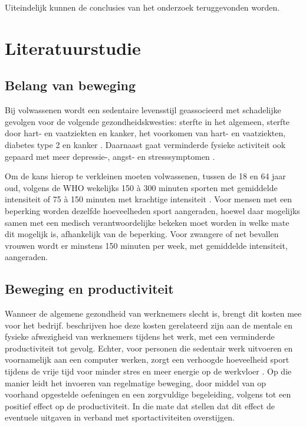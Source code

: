 Uiteindelijk kunnen de conclusies van het onderzoek teruggevonden worden.



\section{Literatuurstudie}%
\label{sec:state-of-the-art}

\subsection{Belang van beweging}

Bij volwassenen wordt een sedentaire levensstijl geassocieerd met schadelijke gevolgen voor de volgende gezondheidskwesties: sterfte in het algemeen, sterfte door hart- en vaatziekten en kanker, het voorkomen van hart- en vaatziekten, diabetes type 2 en kanker \autocite{Bull2020}. Daarnaast gaat verminderde fysieke activiteit ook gepaard met meer depressie-, angst- en stresssymptomen \autocite{Stanton2020}.

Om de kans hierop te verkleinen moeten volwassenen, tussen de 18 en 64 jaar oud, volgens de WHO wekelijks 150 à 300 minuten sporten met gemiddelde intensiteit of 75 à 150 minuten met krachtige intensiteit \autocite{Bull2020}. Voor mensen met een beperking worden dezelfde hoeveelheden sport aangeraden, hoewel daar mogelijks samen met een medisch verantwoordelijke bekeken moet worden in welke mate dit mogelijk is, afhankelijk van de beperking. Voor zwangere of net bevallen vrouwen wordt er minstens 150 minuten per week, met gemiddelde intensiteit, aangeraden.

\subsection{Beweging en productiviteit}

Wanneer de algemene gezondheid van werknemers slecht is, brengt dit kosten mee voor het bedrijf. \textcite{Sjoegaard2016} beschrijven hoe deze kosten gerelateerd zijn aan de mentale en fysieke afwezigheid van werknemers tijdens het werk, met een verminderde productiviteit tot gevolg. Echter, voor personen die sedentair werk uitvoeren en voornamelijk aan een computer werken, zorgt een verhoogde hoeveelheid sport tijdens de vrije tijd voor minder stres en meer energie op de werkvloer \autocite{Hansen2009}. Op die manier leidt het invoeren van regelmatige beweging, door middel van op voorhand opgestelde oefeningen en een zorgvuldige begeleiding, volgens \textcite{Cancelliere2011} tot een positief effect op de productiviteit. In die mate dat \textcite{Sjoegaard2016} stellen dat dit effect de eventuele uitgaven in verband met sportactiviteiten overstijgen.

